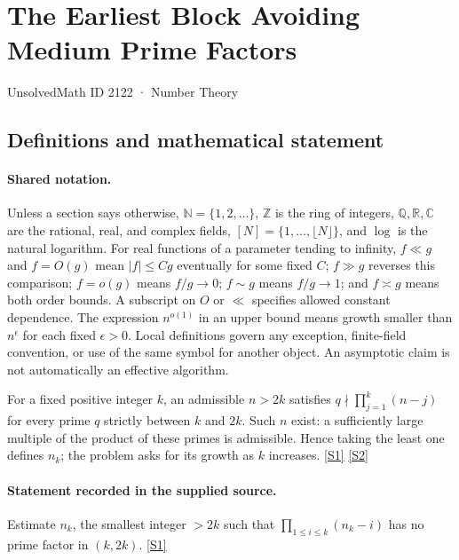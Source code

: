 \documentclass[11pt,a4paper]{article}
\newcommand{\N}{\mathbb{N}}
\newcommand{\Z}{\mathbb{Z}}
\newcommand{\Q}{\mathbb{Q}}
\newcommand{\R}{\mathbb{R}}
\newcommand{\C}{\mathbb{C}}
\newcommand{\sref}[2]{\hyperlink{source:#1:#2}{[S#2]}}
\begin{document}

\setcounter{section}{2121}

\section{The Earliest Block Avoiding Medium Prime Factors}\label{2122}

{\small\sffamily UnsolvedMath ID 2122 · Number Theory}

\subsection{Definitions and mathematical statement}

\paragraph{Shared notation.}Unless a section says otherwise, $\N=\{1,2,\ldots\}$,
$\Z$ is the ring of integers, $\Q,\R,\C$ are the rational, real, and complex
fields, $[N]=\{1,\ldots,\lfloor N\rfloor\}$, and $\log$ is the natural
logarithm. For real functions of a parameter tending to infinity,
$f\ll g$ and $f=O(g)$ mean $|f|\leq Cg$ eventually for some fixed $C$;
$f\gg g$ reverses this comparison; $f=o(g)$ means $f/g\to0$;
$f\sim g$ means $f/g\to1$; and $f\asymp g$ means both order bounds.
A subscript on $O$ or $\ll$ specifies allowed constant dependence.
The expression $n^{o(1)}$ in an upper bound means growth smaller than
$n^\epsilon$ for each fixed $\epsilon>0$. Local definitions govern any
exception, finite-field convention, or use of the same symbol for another
object. An asymptotic claim is not automatically an effective algorithm.



For a fixed positive integer $k$, an admissible $n>2k$ satisfies $q\nmid\prod_{j=1}^{k}(n-j)$ for every prime $q$ strictly between $k$ and $2k$. Such $n$ exist: a sufficiently large multiple of the product of these primes is admissible. Hence taking the least one defines $n_k$; the problem asks for its growth as $k$ increases. \sref{2122}{1} \sref{2122}{2}

\paragraph{Statement recorded in the supplied source.}
Estimate $n_k$, the smallest integer $>2k$ such that $\prod_{1\leq i\leq k}(n_k-i)$ has no prime factor in $(k,2k)$. \sref{2122}{1}
\end{document}
